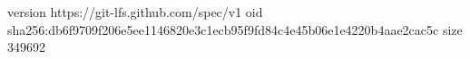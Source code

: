 version https://git-lfs.github.com/spec/v1
oid sha256:db6f9709f206e5ee1146820e3c1ecb95f9fd84c4e45b06e1e4220b4aae2cac5c
size 349692
